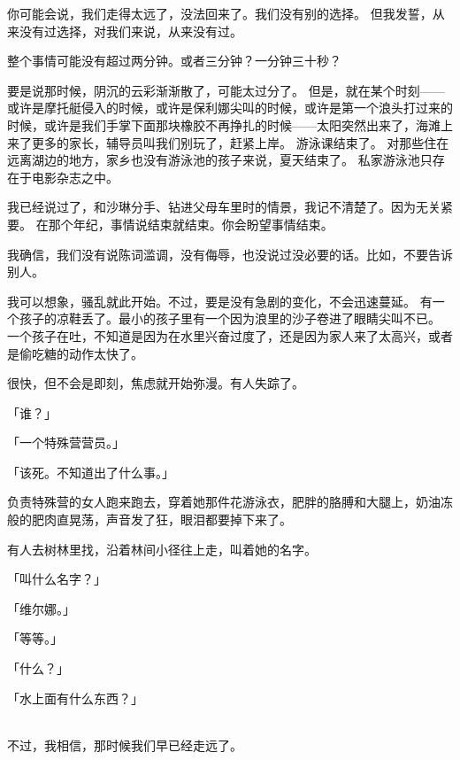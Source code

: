 \documentclass[UTF8]{ctexart}
\begin{document}
你可能会说，我们走得太远了，没法回来了。我们没有别的选择。
但我发誓，从来没有过选择，对我们来说，从来没有过。

整个事情可能没有超过两分钟。或者三分钟？一分钟三十秒？

要是说那时候，阴沉的云彩渐渐散了，可能太过分了。
但是，就在某个时刻——或许是摩托艇侵入的时候，或许是保利娜尖叫的时候，或许是第一个浪头打过来的时候，或许是我们手掌下面那块橡胶不再挣扎的时候——太阳突然出来了，海滩上来了更多的家长，辅导员叫我们别玩了，赶紧上岸。
游泳课结束了。
对那些住在远离湖边的地方，家乡也没有游泳池的孩子来说，夏天结束了。
私家游泳池只存在于电影杂志之中。

我已经说过了，和沙琳分手、钻进父母车里时的情景，我记不清楚了。因为无关紧要。
在那个年纪，事情说结束就结束。你会盼望事情结束。

我确信，我们没有说陈词滥调，没有侮辱，也没说过没必要的话。比如，不要告诉别人。

我可以想象，骚乱就此开始。不过，要是没有急剧的变化，不会迅速蔓延。
有一个孩子的凉鞋丢了。最小的孩子里有一个因为浪里的沙子卷进了眼睛尖叫不已。
一个孩子在吐，不知道是因为在水里兴奋过度了，还是因为家人来了太高兴，或者是偷吃糖的动作太快了。

很快，但不会是即刻，焦虑就开始弥漫。有人失踪了。

「谁？」

「一个特殊营营员。」

「该死。不知道出了什么事。」

负责特殊营的女人跑来跑去，穿着她那件花游泳衣，肥胖的胳膊和大腿上，奶油冻般的肥肉直晃荡，声音发了狂，眼泪都要掉下来了。

有人去树林里找，沿着林间小径往上走，叫着她的名字。

「叫什么名字？」

「维尔娜。」

「等等。」

「什么？」

「水上面有什么东西？」

~\\

不过，我相信，那时候我们早已经走远了。
\end{document}
